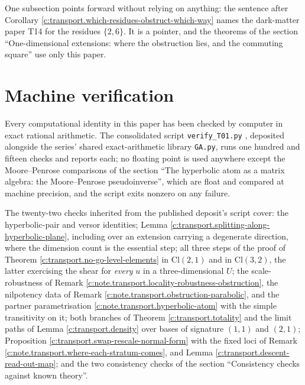 \documentclass[11pt]{article}
\theoremstyle{definition}
\theoremstyle{plain}
\providecommand{\Cl}{}\renewcommand{\Cl}{\mathrm{Cl}}
\begin{document}
One subsection points forward without relying on anything: the sentence after Corollary \ref{c:transport.which-residues-obstruct-which-way} names the dark-matter paper T14 \cite{ButlerT14} for the residues $\{2, 6\}$. It is a pointer, and the theorems of the section ``One-dimensional extensions: where the obstruction lies, and the commuting square'' use only this paper.

\section{Machine verification}

\label{c:note.transport.setting-machine-verification}
Every computational identity in this paper has been checked by computer in exact rational arithmetic. The consolidated script \texttt{verify\_T01.py} \cite{ButlerVerifyT01}, deposited alongside the series' shared exact-arithmetic library \texttt{GA.py}, runs one hundred and fifteen checks and reports each; no floating point is used anywhere except the Moore--Penrose comparisons of the section ``The hyperbolic atom as a matrix algebra: the Moore--Penrose pseudoinverse'', which are float and compared at machine precision, and the script exits nonzero on any failure.

The twenty-two checks inherited from the published deposit's script cover: the hyperbolic-pair and versor identities; Lemma \ref{c:transport.splitting-along-hyperbolic-plane}, including over an extension carrying a degenerate direction, where the dimension count is the essential step; all three steps of the proof of Theorem \ref{c:transport.no-go-level-elements} in $\Cl(2,1)$ and in $\Cl(3,2)$, the latter exercising the shear for \emph{every} $u$ in a three-dimensional $U$; the scale-robustness of Remark \ref{c:note.transport.locality-robustness-obstruction}, the nilpotency data of Remark \ref{c:note.transport.obstruction-parabolic}, and the partner parametrisation \ref{c:note.transport.hyperbolic-atom} with the simple transitivity on it; both branches of Theorem \ref{c:transport.totality} and the limit paths of Lemma \ref{c:transport.density} over bases of signature $(1,1)$ and $(2,1)$; Proposition \ref{c:transport.swap-rescale-normal-form} with the fixed loci of Remark \ref{c:note.transport.where-each-stratum-comes}, and Lemma \ref{c:transport.descent-read-out-map}; and the two consistency checks of the section ``Consistency checks against known theory''.
\end{document}
